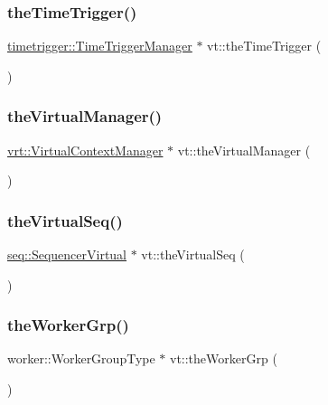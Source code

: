 \mbox{\label{namespacevt_a1e1a39cdf2a3fc1adefcdfcca4716bf2}} 
\subsubsection{\texorpdfstring{the\+Time\+Trigger()}{theTimeTrigger()}}
{\footnotesize\ttfamily \hyperlink{structvt_1_1timetrigger_1_1_time_trigger_manager}{timetrigger\+::\+Time\+Trigger\+Manager} $\ast$ vt\+::the\+Time\+Trigger (\begin{DoxyParamCaption}{ }\end{DoxyParamCaption})}

\mbox{\label{namespacevt_ad46b232b74b745991314a4a509c648f9}} 
\subsubsection{\texorpdfstring{the\+Virtual\+Manager()}{theVirtualManager()}}
{\footnotesize\ttfamily \hyperlink{structvt_1_1vrt_1_1_virtual_context_manager}{vrt\+::\+Virtual\+Context\+Manager} $\ast$ vt\+::the\+Virtual\+Manager (\begin{DoxyParamCaption}{ }\end{DoxyParamCaption})}

\mbox{\label{namespacevt_abdbb9ddb0d79b35c89e9d742d3fc9d42}} 
\subsubsection{\texorpdfstring{the\+Virtual\+Seq()}{theVirtualSeq()}}
{\footnotesize\ttfamily \hyperlink{structvt_1_1seq_1_1_sequencer_virtual}{seq\+::\+Sequencer\+Virtual} $\ast$ vt\+::the\+Virtual\+Seq (\begin{DoxyParamCaption}{ }\end{DoxyParamCaption})}

\mbox{\label{namespacevt_a863076a26364a6b752199a556e54fd60}} 
\subsubsection{\texorpdfstring{the\+Worker\+Grp()}{theWorkerGrp()}}
{\footnotesize\ttfamily worker\+::\+Worker\+Group\+Type $\ast$ vt\+::the\+Worker\+Grp (\begin{DoxyParamCaption}{ }\end{DoxyParamCaption})}

